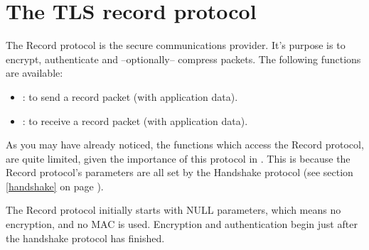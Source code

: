 \section{The TLS record protocol}

The Record protocol is the secure communications provider. It's purpose
is to encrypt, authenticate and --optionally-- compress packets.
The following functions are available:
\par
\begin{itemize}
\item {}:
to send a record packet (with application data).
\item {}:
to receive a record packet (with application data).
\end{itemize}

As you may have already noticed, the functions which access the Record protocol,
are quite limited, given the importance of this protocol in \tls{}.
This is because the Record protocol's parameters are all set by
the Handshake protocol (see section \ref{handshake} on page \pageref{handshake}).
\par
The Record protocol initially starts with NULL parameters, which means
no encryption, and no MAC is used. Encryption and authentication begin
just after the handshake protocol has finished.






